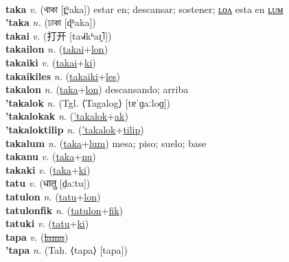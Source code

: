  \label{tafukuci} \\
\textbf{taka} \textit{v.} ({\bengali{}থাকা} [t̪ʰaka])
estar en; descansar; sostener; \hyperref[takalon]{ʟᴏᴧ} esta en \hyperref[takalum]{ʟᴜᴍ} \label{taka} \\
\textbf{'taka} \textit{n.} ({\bengali{}ঢাকা} [ɖʱaka])
 \label{'taka} \\
\textbf{takai} \textit{v.} ({\chinese{}打开} [ta˧˩˧kʰaɪ̯˥])
 \label{takai} \\
\textbf{takailon} \textit{n.} (\hyperref[takai]{takai}+\hyperref[lon]{lon})
 \label{takailon} \\
\textbf{takaiki} \textit{v.} (\hyperref[takai]{takai}+\hyperref[ki]{ki})
 \label{takaiki} \\
\textbf{takaikiles} \textit{n.} (\hyperref[takaiki]{takaiki}+\hyperref[les]{les})
 \label{takaikiles} \\
\textbf{takalon} \textit{n.} (\hyperref[taka]{taka}+\hyperref[lon]{lon})
descansando; arriba \label{takalon} \\
\textbf{'takalok} \textit{n.} (Tgl. ⟨Tagalog⟩ [tɐˈɡaːloɡ])
 \label{'takalok} \\
\textbf{'takalokak} \textit{n.} (\hyperref['takalok]{'takalok}+\hyperref[ak]{ak})
 \label{'takalokak} \\
\textbf{'takaloktilip} \textit{n.} (\hyperref['takalok]{'takalok}+\hyperref[tilip]{tilip})
 \label{'takaloktilip} \\
\textbf{takalum} \textit{n.} (\hyperref[taka]{taka}+\hyperref[lum]{lum})
mesa; piso; suelo; base \label{takalum} \\
\textbf{takanu} \textit{v.} (\hyperref[taka]{taka}+\hyperref[nu]{nu})
 \label{takanu} \\
\textbf{takaki} \textit{v.} (\hyperref[taka]{taka}+\hyperref[ki]{ki})
 \label{takaki} \\
\textbf{tatu} \textit{v.} ({\devanagari{}धातु} [d̤aːtu])
 \label{tatu} \\
\textbf{tatulon} \textit{n.} (\hyperref[tatu]{tatu}+\hyperref[lon]{lon})
 \label{tatulon} \\
\textbf{tatulonfik} \textit{n.} (\hyperref[tatulon]{tatulon}+\hyperref[fik]{fik})
 \label{tatulonfik} \\
\textbf{tatuki} \textit{v.} (\hyperref[tatu]{tatu}+\hyperref[ki]{ki})
 \label{tatuki} \\
\textbf{tapa} \textit{v.} (\hyperref[lama]{\sout{lama}})
 \label{tapa} \\
\textbf{'tapa} \textit{n.} (Tah. ⟨tapa⟩ [tapa])
 \label{'tapa} \\
